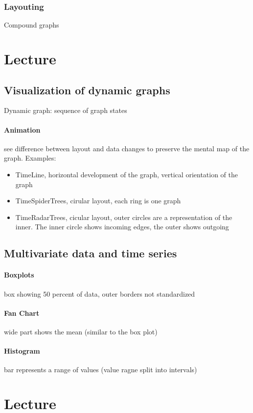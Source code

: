 \documentclass[10pt,a4paper]{article}
\begin{document}
	\subsubsection*{Layouting}
	Compound graphs

\section{Lecture}
	\subsection{Visualization of dynamic graphs}
	Dynamic graph: sequence of graph states
	\paragraph{Animation} see difference between layout and data changes to preserve the mental map of the graph. Examples:
	\begin{itemize}
		\item TimeLine, horizontal development of the graph, vertical orientation of the graph  
		\item TimeSpiderTrees, cirular layout, each ring is one graph
		\item TimeRadarTrees, cicular layout, outer circles are a representation of the inner. The inner circle shows incoming edges, the outer shows outgoing
	\end{itemize}
	
	\subsection{Multivariate data and time series}
	\paragraph{Boxplots} box showing 50 percent of data, outer borders not standardized
	\paragraph{Fan Chart} wide part shows the mean (similar to the box plot) 
	\paragraph{Histogram} bar represents a range of values (value ragne split into intervals)

\section{Lecture}
\end{document}
